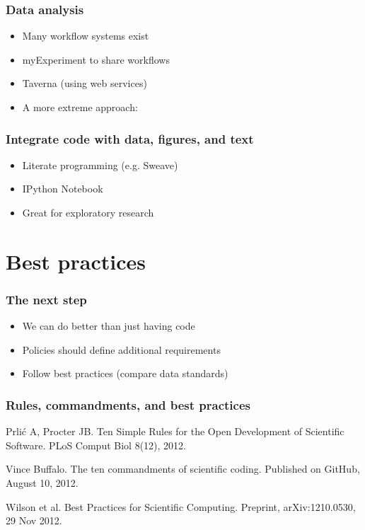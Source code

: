 \documentclass[slidestop]{beamer}
\begin{document}
\begin{frame}
  \frametitle{Data analysis}
  \begin{itemize}
    \item<1-> Many workflow systems exist
    \item<2-> myExperiment to share workflows
    \item<3-> Taverna (using web services)
    \item<4-> A more extreme approach:
  \end{itemize}

\end{frame}

\begin{frame}
  \frametitle{Integrate code with data, figures, and text}
  \begin{itemize}[<+->]
    \item Literate programming (e.g. Sweave)
    \item IPython Notebook
    \item Great for exploratory research
  \end{itemize}
\end{frame}


\section{Best practices}

\begin{frame}
  \frametitle{The next step}
  \begin{itemize}
    \item We can do better than just having code
    \item Policies should define additional requirements
    \item Follow best practices (compare data standards)
  \end{itemize}
\end{frame}

\begin{frame}
  \frametitle{Rules, commandments, and best practices}
  Prli\'c A, Procter JB. Ten Simple Rules for the Open Development of Scientific
  Software. PLoS Comput Biol 8(12), 2012.

  \vspace{0.5cm}

  Vince Buffalo. The ten commandments of scientific coding. Published on
  GitHub, August 10, 2012.

  \vspace{0.5cm}

  Wilson et al. Best Practices for Scientific Computing. Preprint,
  arXiv:1210.0530, 29 Nov 2012.
\end{frame}
\end{document}
